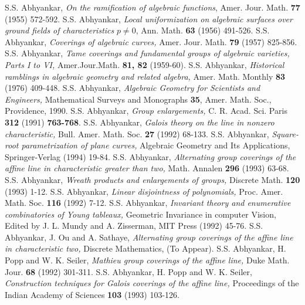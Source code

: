 \begin{thebibliography}{99}
 S.S. Abhyankar, \textit{On the ramification of algebraic functions}, Amer. Jour. Math. {\bf 77} (1955) 572-592.
 S.S. Abhyankar, \textit{Local uniformization on algebraic surfaces over ground fields of characteristics} $p\neq 0$, Ann. Math. {\bf 63} (1956) 491-526.
 S.S. Abhyankar, \textit{Coverings of algebraic curves,} Amer. Jour. Math. {\bf 79} (1957) 825-856.
 S.S. Abhyankar, \textit{Tame coverings and fundamental groups of algebraic varieties, Parts I to VI,} Amer.Jour.Math. {\bf 81, 82} (1959-60).
 S.S. Abhyankar, \textit{Historical ramblings in algebraic geometry and related algebra,} Amer. Math. Monthly {\bf 83} (1976) 409-448.
 S.S. Abhyankar, \textit{Algebraic Geometry for Scientists and Engineers,} Mathematical Surveys and Monographs {\bf 35}, Amer. Math. Soc., Providence, 1990.
 S.S. Abhyankar, \textit{Group enlargements,} C. R. Acad. Sci. Paris {\bf 312} (1991) {\bf 763-768}.
 S.S. Abhyankar, \textit{Galois theory on the line in nonzero characteristic,} Bull. Amer. Math. Soc. {\bf 27} (1992) 68-133.
 S.S. Abhyankar, \textit{Square-root parametrization of plane curves,} Algebraic Geometry and Its Applications, Springer-Verlag (1994) 19-84.
 S.S. Abhyankar, \textit{Alternating group coverings of the affine line in characteristic greater than two,} Math. Annalen {\bf 296} (1993) 63-68.
 S.S. Abhyankar, \textit{Wreath products and enlargements of groups,} Discrete Math. {\bf 120} (1993) 1-12.
 S.S. Abhyankar, \textit{Linear disjointness of polynomials,} Proc. Amer. Math. Soc. {\bf 116} (1992) 7-12.
 S.S. Abhyankar, \textit{Invariant theory and enumerative combinatories of Young tableaux,} Geometric Invariance in computer Vision, Edited by J. L. Mundy and A. Zisserman, MIT Press (1992) 45-76.
 S.S. Abhyankar, J. Ou and A. Sathaye, \textit{Alternating group coverings of the affine line in characteristic two,} Discrete Mathematics, (To Appear).
 S.S. Abhyankar, H. Popp and W. K. Seiler, \textit{Mathieu group coverings of the affine line,} Duke Math. Jour. {\bf 68} (1992) 301-311.
 S.S. Abhyankar, H. Popp and W. K. Seiler, \textit{Construction techniques for Galois coverings of the affine line,} Proceedings of the Indian Academy of Sciences {\bf 103} (1993) 103-126.

\end{thebibliography}
